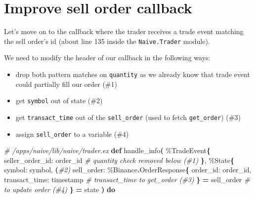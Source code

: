 \documentclass[
  oneside]{book}
\newenvironment{Shaded}{\begin{snugshade}}{\end{snugshade}}
\newcommand{\CommentTok}[1]{\textcolor[rgb]{0.56,0.35,0.01}{\textit{#1}}}
\newcommand{\ConstantTok}[1]{\textcolor[rgb]{0.56,0.35,0.01}{#1}}
\newcommand{\FunctionTok}[1]{\textcolor[rgb]{0.13,0.29,0.53}{\textbf{#1}}}
\newcommand{\KeywordTok}[1]{\textcolor[rgb]{0.13,0.29,0.53}{\textbf{#1}}}
\newcommand{\NormalTok}[1]{#1}
\newcommand{\OperatorTok}[1]{\textcolor[rgb]{0.81,0.36,0.00}{\textbf{#1}}}
\newcommand{\VariableTok}[1]{\textcolor[rgb]{0.00,0.00,0.00}{#1}}
\providecommand{\tightlist}{%
  \setlength{\itemsep}{0pt}\setlength{\parskip}{0pt}}
\begin{document}
\section{Improve sell order callback}\label{improve-sell-order-callback}

Let's move on to the callback where the trader receives a trade event matching the sell order's id (about line 135 inside the \texttt{Naive.Trader} module).

\newpage

We need to modify the header of our callback in the following ways:

\begin{itemize}
\tightlist
\item
  drop both pattern matches on \texttt{quantity} as we already know that trade event could partially fill our order (\#1)
\item
  get \texttt{symbol} out of state (\#2)
\item
  get \texttt{transact\_time} out of the \texttt{sell\_order} (used to fetch \texttt{get\_order}) (\#3)
\item
  assign \texttt{sell\_order} to a variable (\#4)
\end{itemize}

\begin{Shaded}
\begin{Highlighting}[]
  \CommentTok{\# /apps/naive/lib/naive/trader.ex}
  \KeywordTok{def}\NormalTok{ handle\_info}\FunctionTok{(}
\NormalTok{        \%}\ConstantTok{TradeEvent}\FunctionTok{\{}
          \VariableTok{seller\_order\_id:}\NormalTok{ order\_id }\CommentTok{\# \textasciigrave{}quantity\textasciigrave{} check removed below (\#1)}
        \FunctionTok{\}}\NormalTok{,}
\NormalTok{        \%}\ConstantTok{State}\FunctionTok{\{}
          \VariableTok{symbol:}\NormalTok{ symbol, }\FunctionTok{(}\CommentTok{\#2)}
          \VariableTok{sell\_order:}
\NormalTok{            \%}\ConstantTok{Binance}\OperatorTok{.}\ConstantTok{OrderResponse}\FunctionTok{\{}
              \VariableTok{order\_id:}\NormalTok{ order\_id,}
              \VariableTok{transact\_time:}\NormalTok{ timestamp }\CommentTok{\# \textasciigrave{}transact\_time\textasciigrave{} to \textasciigrave{}get\_order\textasciigrave{} (\#3)}
            \FunctionTok{\}} \OperatorTok{=}\NormalTok{ sell\_order }\CommentTok{\# to update order (\#4)}
        \FunctionTok{\}} \OperatorTok{=}\NormalTok{ state}
      \FunctionTok{)} \KeywordTok{do}
\end{Highlighting}
\end{Shaded}
\end{document}
